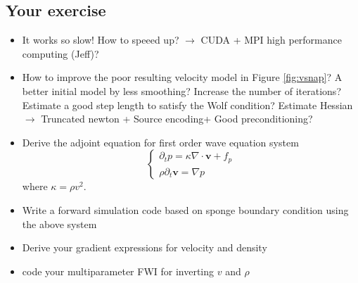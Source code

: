 
 
 
\subsection{Your exercise}

\begin{itemize}
  \item It works so slow! How to speeed up? $\rightarrow$ CUDA \citep[Mgpufwi.cu]{Yang_2015_GPU} + MPI high performance computing (Jeff)?
  
  \item How to improve the poor resulting velocity model in Figure \ref{fig:vsnap}? A better initial model by less smoothing? Increase the number of iterations?  Estimate a good step length to satisfy the Wolf condition?  
  Estimate Hessian $\rightarrow$ Truncated newton \citep{Metivier_2014_FWI}+ Source encoding+ Good preconditioning?


 \item Derive the adjoint equation  for first order wave equation system
 \begin{equation}
  \begin{cases}
   \partial_t p=\kappa \nabla\cdot \mathbf{v}+ f_p   \\
   \rho \partial_t \mathbf{v}= \nabla p
  \end{cases}
 \end{equation}
 where $\kappa=\rho v^2$.
 \item Write a forward simulation code based on sponge boundary condition using the above system
 
 \item Derive your gradient expressions for velocity and density 
 
 \item code your multiparameter FWI for inverting $v$ and $\rho$ 

\end{itemize}

